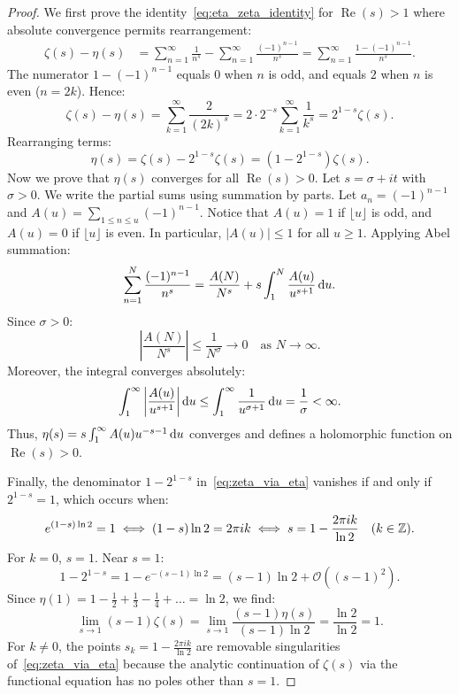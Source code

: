 \begin{proof}
\leanok
We first prove the identity~\eqref{eq:eta_zeta_identity} for $\operatorname{Re}(s) > 1$ where absolute convergence permits rearrangement:
\begin{align*}
\zeta(s) - \eta(s) &= \sum_{n=1}^\infty \frac{1}{n^s} - \sum_{n=1}^\infty \frac{(-1)^{n-1}}{n^s} = \sum_{n=1}^\infty \frac{1 - (-1)^{n-1}}{n^s}.
\end{align*}
The numerator $1 - (-1)^{n-1}$ equals $0$ when $n$ is odd, and equals $2$ when $n$ is even ($n = 2k$). Hence:
$$\zeta(s) - \eta(s) = \sum_{k=1}^\infty \frac{2}{(2k)^s} = 2 \cdot 2^{-s} \sum_{k=1}^\infty \frac{1}{k^s} = 2^{1-s} \zeta(s).$$
Rearranging terms:
$$\eta(s) = \zeta(s) - 2^{1-s} \zeta(s) = \left(1 - 2^{1-s}\right) \zeta(s).$$
Now we prove that $\eta(s)$ converges for all $\operatorname{Re}(s) > 0$. Let $s = \sigma + i t$ with $\sigma > 0$. We write the partial sums using summation by parts. Let $a_n = (-1)^{n-1}$ and $A(u) = \sum_{1 \le n \le u} (-1)^{n-1}$. Notice that $A(u) = 1$ if $\lfloor u \rfloor$ is odd, and $A(u) = 0$ if $\lfloor u \rfloor$ is even. In particular, $|A(u)| \le 1$ for all $u \ge 1$.
Applying Abel summation:
$$\sum_{n=1}^N \frac{(-1)^{n-1}}{n^s} = \frac{A(N)}{N^s} + s \int_1^N \frac{A(u)}{u^{s+1}} \, \mathrm{d} u.$$
Since $\sigma > 0$:
$$\left| \frac{A(N)}{N^s} \right| \le \frac{1}{N^\sigma} \to 0 \quad \text{as } N \to \infty.$$
Moreover, the integral converges absolutely:
$$\int_1^\infty \left| \frac{A(u)}{u^{s+1}} \right| \mathrm{d} u \le \int_1^\infty \frac{1}{u^{\sigma+1}} \, \mathrm{d} u = \frac{1}{\sigma} < \infty.$$
Thus, $\eta(s) = s \int_1^\infty A(u) u^{-s-1} \, \mathrm{d} u$ converges and defines a holomorphic function on $\operatorname{Re}(s) > 0$.

Finally, the denominator $1 - 2^{1-s}$ in~\eqref{eq:zeta_via_eta} vanishes if and only if $2^{1-s} = 1$, which occurs when:
$$e^{(1-s)\ln 2} = 1 \iff (1-s)\ln 2 = 2\pi i k \iff s = 1 - \frac{2\pi i k}{\ln 2} \quad (k \in \mathbb{Z}).$$
For $k = 0$, $s = 1$. Near $s = 1$:
$$1 - 2^{1-s} = 1 - e^{-(s-1)\ln 2} = (s-1)\ln 2 + \mathcal{O}\left((s-1)^2\right).$$
Since $\eta(1) = 1 - \frac{1}{2} + \frac{1}{3} - \frac{1}{4} + \dots = \ln 2$, we find:
$$\lim_{s \to 1} (s-1)\zeta(s) = \lim_{s \to 1} \frac{(s-1)\eta(s)}{(s-1)\ln 2} = \frac{\ln 2}{\ln 2} = 1.$$
For $k \neq 0$, the points $s_k = 1 - \frac{2\pi i k}{\ln 2}$ are removable singularities of~\eqref{eq:zeta_via_eta} because the analytic continuation of $\zeta(s)$ via the functional equation has no poles other than $s = 1$.
\end{proof}

